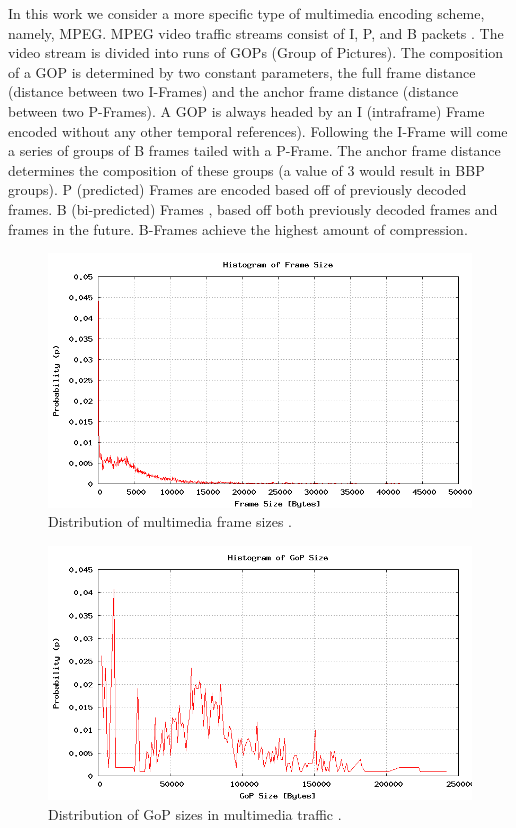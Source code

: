 \documentclass{llncs}
\begin{document}
In this work we consider a more specific type of multimedia encoding scheme, namely, MPEG. MPEG video traffic streams consist of I, P, and B packets \cite{netperfeval2004}\cite{trafficqual2008}. The video stream is divided into runs of GOPs (Group of Pictures). The composition of a GOP is determined by two constant parameters, the full frame distance (distance between two I-Frames) and the anchor frame distance (distance between two P-Frames). A GOP is always headed by an I (intraframe) Frame  encoded without any other temporal references). Following the I-Frame will come a series of groups of B frames tailed with a P-Frame. The anchor frame distance determines the composition of these groups (a value of 3 would result in BBP groups). P (predicted) Frames  are encoded based off of previously decoded frames. B (bi-predicted) Frames , based off both previously decoded frames and frames in the future. B-Frames achieve the highest amount of compression.

\begin{figure}
\begin{center}
\includegraphics[scale=0.35]{frame.png}
\caption{Distribution of multimedia frame sizes \cite{sony-demo}.}
\label{fig:frame}
\end{center}
\end{figure}

\begin{figure}
\begin{center}
\includegraphics[scale=0.35]{gop.png}
\caption{Distribution of GoP sizes in multimedia traffic \cite{sony-demo}.}
\label{fig:gop}
\end{center}
\end{figure}
\end{document}
